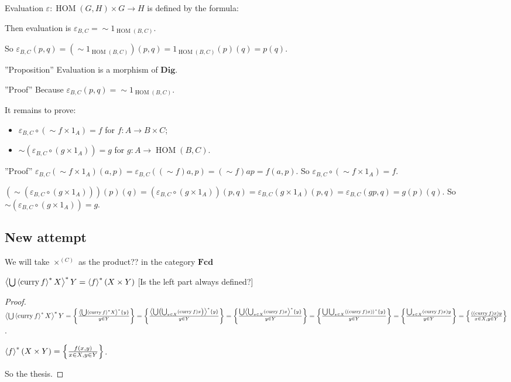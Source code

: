 Evaluation $\varepsilon : \operatorname{HOM} ( G , H) \times G \rightarrow H$ is defined by the formula:

Then evaluation is $\varepsilon_{B, C} = \mathop{\sim} 1_{\operatorname{HOM}(B,C)}$.

So $\varepsilon_{B, C} ( p , q) = ( \mathop{\sim} 1_{\operatorname{HOM}(B,C)}) ( p , q) = 1_{\operatorname{HOM}(B,C)} ( p) ( q) = p ( q)$.

''Proposition'' Evaluation is a morphism of $\mathbf{Dig}$.

''Proof'' Because $\varepsilon_{B, C} ( p , q) = \mathop{\sim} 1_{\operatorname{HOM}(B,C)}$.

It remains to prove:
\begin{itemize}
\item $\varepsilon_{B, C} \circ ( \sim f \times 1_{A}) = f$ for $f : A \rightarrow B \times C$;
\item $\sim ( \varepsilon_{B, C} \circ ( g \times 1_{A})) = g$ for $g : A \rightarrow \operatorname{HOM} ( B , C)$.
\end{itemize}

''Proof'' $\varepsilon_{B, C} ( \sim f \times 1_{A}) ( a , p) = \varepsilon_{B, C} ( ( \sim f) a , p) = ( \sim f) a p = f ( a , p)$. So $\varepsilon_{B, C} \circ ( \sim f \times 1_{A}) = f$.

  $(\sim ( \varepsilon_{B, C} \circ ( g \times 1_{A}))) ( p) ( q) = ( \varepsilon_{B, C} \circ ( g \times 1_{A})) ( p , q) = \varepsilon_{B, C} ( g \times 1_{A}) ( p , q) = \varepsilon_{B, C} ( g p , q) = g ( p) ( q)$. So $\sim ( \varepsilon_{B, C} \circ ( g \times 1_{A})) = g$.

\subsection{New attempt}

We will take $\times^{(C)}$ as the product?? in the category $\mathbf{Fcd}$

\begin{prop}
$\left\langle \bigcup\left\langle \operatorname{curry} f\right\rangle ^{\ast}X\right\rangle ^{\ast}Y=
\left\langle f\right\rangle ^{\ast}(X\times Y)$
[Is the left part always defined?]
\end{prop}

\begin{proof}
$\left\langle \bigcup\left\langle \operatorname{curry} f\right\rangle ^{\ast}X\right\rangle ^{\ast}Y=\left\{ \frac{\left\langle \bigcup\left\langle \operatorname{curry} f\right\rangle ^{\ast}X\right\rangle ^{\ast}\{y\}}{y\in Y}\right\}=
\left\{ \frac{\left\langle \bigcup\left(\bigcup_{x\in X}(\operatorname{curry} f)x\right)\right\rangle ^{\ast}\{y\}}{y\in Y}\right\}=
\left\{ \frac{\bigcup\left\langle \bigcup_{x\in X}(\operatorname{curry} f)x\right\rangle ^{\ast}\{y\}}{y\in Y}\right\}=
\left\{ \frac{\bigcup\bigcup_{x\in X}\left\langle (\operatorname{curry} f)x)\right\rangle ^{\ast}\{y\}}{y\in Y}\right\}=
\left\{ \frac{\bigcup_{x\in X}(\operatorname{curry} f)x)y}{y\in Y}\right\}=
\left\{ \frac{((\operatorname{curry} f)x)y}{x\in X,y\in Y}\right\}$.

$\left\langle f\right\rangle ^{\ast}(X\times Y)=\left\{ \frac{f(x,y)}{x\in X,y\in Y}\right\}$.

So the thesis.
\end{proof}

